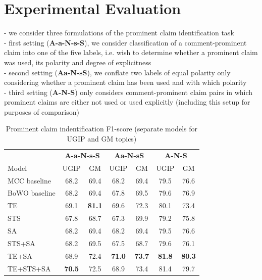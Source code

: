 \section{Experimental Evaluation}
\label{sec:argrec_experiments}

- we consider three formulations of the prominent claim identification task \\
- first setting (\textbf{A-a-N-s-S}), we consider classification of a comment-prominent claim
into one of the five labels, i.e. wish to determine whether a prominent claim was used, 
its polarity and degree of explicitness \\
- second setting (\textbf{Aa-N-sS}), we conflate two labels of equal polarity only considering
whether a prominent claim has been used and with which polarity \\
- third setting (\textbf{A-N-S}) only considers comment-prominent claim pairs in which prominent claims
are either not used or used explicitly (including this setup for purposes of comparison) \\

\begin{table}
\centering
{\small
\begin{tabular}{@{}l cc cc cc @{}}
\toprule
& 
\multicolumn{2}{c}{\textbf{A-a-N-s-S}} &
\multicolumn{2}{c}{\textbf{Aa-N-sS}} &
\multicolumn{2}{c}{\textbf{A-N-S}} \\
\cmidrule(lr){2-3}
\cmidrule(lr){4-5}
\cmidrule(lr){6-7}
Model & UGIP & GM & UGIP & GM & UGIP & GM \\ 
\midrule
MCC baseline  & 68.2 & 69.4 & 68.2 & 69.4  & 79.5 & 76.6        \\
BoWO baseline & 68.2 & 69.4 & 67.8 & 69.5 & 79.6 & 76.9        \\[1ex]
TE            & 69.1 & \textbf{81.1} & 69.6 & 72.3 & 80.1 & 73.4        \\
STS           & 67.8 & 68.7 & 67.3 & 69.9 & 79.2 & 75.8        \\
SA            & 68.2 & 69.4 & 68.2 & 69.4 & 79.5 & 76.6        \\[1ex]
STS+SA        & 68.2 & 69.5 & 67.5 & 68.7 & 79.6 & 76.1         \\
TE+SA         & 68.9 & 72.4 & \textbf{71.0} & \textbf{73.7} & \textbf{81.8} & \textbf{80.3}    \\[1ex]
TE+STS+SA   & \textbf{70.5} & 72.5 & 68.9 & 73.4 & 81.4 & 79.7        \\
\bottomrule
\end{tabular}}
\caption{Prominent claim indentification F1-score (separate models for UGIP and GM topics)}
\label{tab:claim_identification_results}
\end{table}

